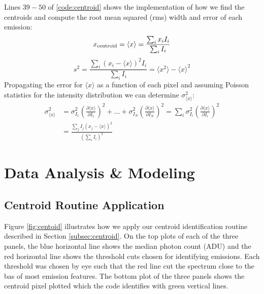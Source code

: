 \documentclass[preprint]{aastex62}
\begin{document}
Lines $39-50$ of \ref{code:centroid} shows the implementation of how we find the centroids and compute the root mean squared (rms) width and error of each emission:
\begin{equation}
    x_{\rm centroid} = \langle x \rangle = \frac{\sum_i x_i I_i}{\sum_i I_i} 
\end{equation}
\begin{equation}
    s^2 = \frac{\sum_i (x_i - \langle x \rangle)^2 I_i}{\sum_i I_i} = \langle x^2 \rangle - \langle x \rangle^2
\end{equation}
Propagating the error for $\langle x \rangle$ as a function of each pixel and assuming Poisson statistics for the intensity distribution we can determine $\sigma_{\langle x \rangle}^2$:
\begin{align}
    \sigma_{\langle x \rangle}^2 
    &= \sigma_{I_1}^2 \left(\frac{\partial \langle x \rangle}{\partial I_1} \right)^2
    + ... + \sigma_{I_N}^2 \left(\frac{\partial \langle x \rangle}{\partial I_N} \right)^2
    = \sum_i \sigma_{I_i}^2 \left(\frac{\partial \langle x \rangle}{\partial I_i} \right)^2 \\
    &= \frac{\sum_j I_j (x_j - \langle x \rangle)^2}{\left(\sum_i I_i \right)^2}
\end{align}


\section{Data Analysis \& Modeling} \label{sec:analysis}
\subsection{Centroid Routine Application}
Figure \ref{fig:centoid} illustrates how we apply our centroid identification routine described in Section \ref{subsec:centroid}. On the top plots of each of the three panels, the blue horizontal line shows the median photon count (ADU) and the red horizontal line shows the threshold cuts chosen for identifying emissions. Each threshold was chosen by eye such that the red line cut the spectrum close to the bas of most emission features. The bottom plot of the three panels shows the centroid pixel plotted which the code identifies with green vertical lines.
\end{document}
